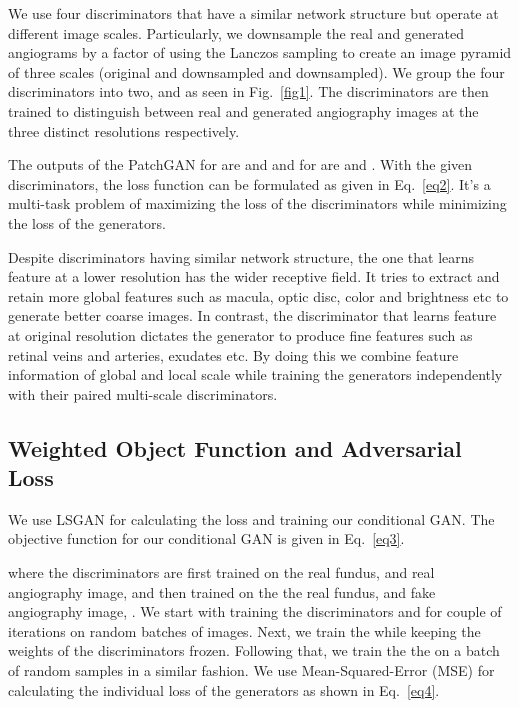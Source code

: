 \documentclass[runningheads]{llncs}
\begin{document}
We use four discriminators that have a similar network structure but operate at different image scales. Particularly, we downsample the real and generated angiograms by a factor of  using the Lanczos sampling to create an image pyramid of three scales (original and downsampled and downsampled). We group the four discriminators into two,  and  as seen in Fig.~\ref{fig1}. The discriminators are then trained to distinguish between real and generated angiography images at the three distinct resolutions respectively. 

The outputs of the PatchGAN for  are  and  and for  are  and . With the given discriminators, the loss function can be formulated as given in Eq.~\ref{eq2}. It's a multi-task problem of maximizing the loss of the discriminators while minimizing the loss of the generators. 


Despite discriminators having similar network structure, the one that learns feature at a lower resolution has the wider receptive field.  It tries to extract and retain more global features such as macula, optic disc, color and brightness etc to generate better coarse images. In contrast,  the  discriminator that learns feature at original resolution dictates the generator to produce fine features such as retinal veins and arteries, exudates etc. By doing this we combine feature information of global and local scale while training the generators independently with their paired multi-scale discriminators.

\subsection{Weighted Object Function and Adversarial Loss}\label{subsec:objective}

We use LSGAN \cite{mao2017least} for calculating the loss and training our conditional GAN. The objective function for our conditional GAN is given in Eq.~\ref{eq3}. 


where the discriminators are first trained on the real fundus,  and real angiography image,  and then trained on the the real fundus,  and fake angiography image, . We start with training the discriminators  and  for couple of iterations on random batches of images. Next, we train the  while keeping the weights of the discriminators frozen. Following that, we train the the  on a batch of random samples in a similar fashion. We use Mean-Squared-Error (MSE) for calculating the individual loss of the generators as shown in Eq.~\ref{eq4}.
\end{document}

